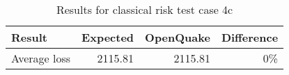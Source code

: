 \begin{table}[htbp]

\centering
\begin{tabular}{ l r r r }

\hline
\rowcolor{anti-flashwhite}
\bf{Result} & \bf{Expected} & \bf{OpenQuake} & \bf{Difference}\\
\hline
Average loss & 2115.81 & 2115.81 & 0\% \\
\hline
\end{tabular}

\caption{Results for classical risk test case 4c}
\label{tab:result-classical-risk-4c}
\end{table}